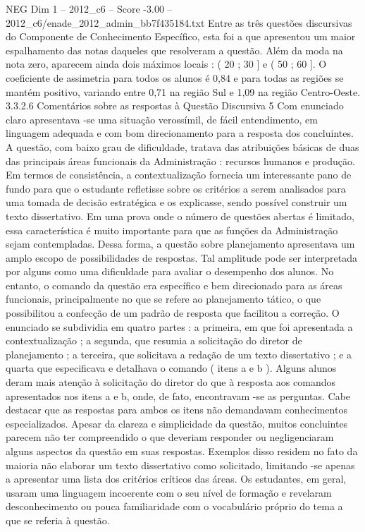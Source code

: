 \begin{textsample}{NEG Dim 1 – 2012\_c6 – Score -3.00 – 2012\_c6/enade\_2012\_admin\_bb7f435184.txt}
Entre as três questões discursivas do Componente de Conhecimento Específico, esta foi a que apresentou um maior espalhamento das notas daqueles que resolveram a questão.
Além da moda na nota zero, aparecem ainda dois máximos locais : ( 20 ; 30 ] e ( 50 ; 60 ].
O coeficiente de assimetria para todos os alunos é 0,84 e para todas as regiões se mantém positivo, variando entre 0,71 na região Sul e 1,09 na região Centro-Oeste. 3.3.2.6 Comentários sobre as respostas à Questão Discursiva 5 Com enunciado claro apresentava -se uma situação verossímil, de fácil entendimento, em linguagem adequada e com bom direcionamento para a resposta dos concluintes.
A questão, com baixo grau de dificuldade, tratava das atribuições básicas de duas das principais áreas funcionais da Administração : recursos humanos e produção.
Em termos de consistência, a contextualização fornecia um interessante pano de fundo para que o estudante refletisse sobre os critérios a serem analisados para uma tomada de decisão estratégica e os explicasse, sendo possível construir um texto dissertativo.
Em uma prova onde o número de questões abertas é limitado, essa característica é muito importante para que as funções da Administração sejam contempladas.
Dessa forma, a questão sobre planejamento apresentava um amplo escopo de possibilidades de respostas.
Tal amplitude pode ser interpretada por alguns como uma dificuldade para avaliar o desempenho dos alunos.
No entanto, o comando da questão era específico e bem direcionado para as áreas funcionais, principalmente no que se refere ao planejamento tático, o que possibilitou a confecção de um padrão de resposta que facilitou a correção.
O enunciado se subdividia em quatro partes : a primeira, em que foi apresentada a contextualização ; a segunda, que resumia a solicitação do diretor de planejamento ; a terceira, que solicitava a redação de um texto dissertativo ; e a quarta que especificava e detalhava o comando ( itens a e b ).
Alguns alunos deram mais atenção à solicitação do diretor do que à resposta aos comandos apresentados nos itens a e b, onde, de fato, encontravam -se as perguntas.
Cabe destacar que as respostas para ambos os itens não demandavam conhecimentos especializados.
Apesar da clareza e simplicidade da questão, muitos concluintes parecem não ter compreendido o que deveriam responder ou negligenciaram alguns aspectos da questão em suas respostas.
Exemplos disso residem no fato da maioria não elaborar um texto dissertativo como solicitado, limitando -se apenas a apresentar uma lista dos critérios críticos das áreas.
Os estudantes, em geral, usaram uma linguagem incoerente com o seu nível de formação e revelaram desconhecimento ou pouca familiaridade com o vocabulário próprio do tema a que se referia à questão.

\end{textsample}
